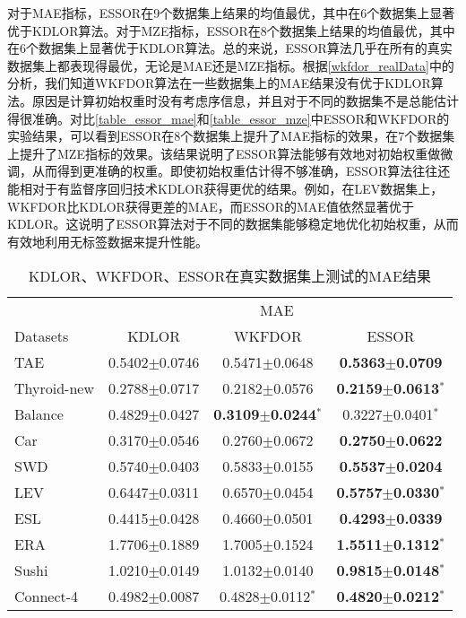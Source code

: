 对于MAE指标，ESSOR在9个数据集上结果的均值最优，其中在6个数据集上显著优于KDLOR算法。对于MZE指标，ESSOR在8个数据集上结果的均值最优，其中在6个数据集上显著优于KDLOR算法。总的来说，ESSOR算法几乎在所有的真实数据集上都表现得最优，无论是MAE还是MZE指标。根据\autoref{wkfdor_realData}中的分析，我们知道WKFDOR算法在一些数据集上的MAE结果没有优于KDLOR算法。原因是计算初始权重时没有考虑序信息，并且对于不同的数据集不是总能估计得很准确。对比\autoref{table_essor_mae}和\autoref{table_essor_mze}中ESSOR和WKFDOR的实验结果，可以看到ESSOR在8个数据集上提升了MAE指标的效果，在7个数据集上提升了MZE指标的效果。该结果说明了ESSOR算法能够有效地对初始权重做微调，从而得到更准确的权重。即使初始权重估计得不够准确，ESSOR算法往往还能相对于有监督序回归技术KDLOR获得更优的结果。例如，在LEV数据集上，WKFDOR比KDLOR获得更差的MAE，而ESSOR的MAE值依然显著优于KDLOR。这说明了ESSOR算法对于不同的数据集能够稳定地优化初始权重，从而有效地利用无标签数据来提升性能。


\begin{table*}[!h]
\caption{KDLOR、WKFDOR、ESSOR在真实数据集上测试的MAE结果}
\label{table_essor_mae}
\centering
\begin{tabular}{l|ccc}
\toprule
 & \multicolumn {3}{c}{MAE} \\
 \cmidrule {2-4}
Datasets & KDLOR & WKFDOR & ESSOR \\
\midrule
TAE &  0.5402$\pm$0.0746 &  0.5471$\pm$0.0648 & {\bf 0.5363$\pm$0.0709} \\
Thyroid-new & 0.2788$\pm$0.0717 &  0.2182$\pm$0.0576 & {\bf 0.2159$\pm$0.0613}$^{*}$ \\
Balance & 0.4829$\pm$0.0427 &  {\bf 0.3109$\pm$0.0244}$^{*}$ & 0.3227$\pm$0.0401$^{*}$ \\
Car & 0.3170$\pm$0.0546 &  0.2760$\pm$0.0672 & {\bf 0.2750$\pm$0.0622} \\
SWD & 0.5740$\pm$0.0403 &  0.5833$\pm$0.0155 & {\bf 0.5537$\pm$0.0204} \\
LEV & 0.6447$\pm$0.0311 &  0.6570$\pm$0.0454 & {\bf 0.5757$\pm$0.0330}$^{*}$ \\
ESL & 0.4415$\pm$0.0428 &  0.4660$\pm$0.0501 & {\bf 0.4293$\pm$0.0339} \\
ERA & 1.7706$\pm$0.1889 &  1.7005$\pm$0.1524 & {\bf 1.5511$\pm$0.1312}$^{*}$ \\
Sushi & 1.0210$\pm$0.0149 & 1.0132$\pm$0.0140 & {\bf 0.9815$\pm$0.0148}$^{*}$ \\
Connect-4 & 0.4982$\pm$0.0087 & 0.4828$\pm$0.0112$^{*}$ & {\bf 0.4820$\pm$0.0212}$^{*}$ \\
\bottomrule
\end{tabular}
\end{table*}

